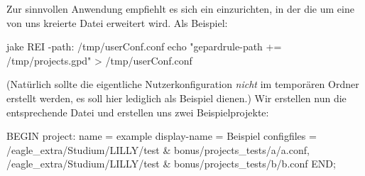 \begin{bemerkung}
    Zur sinnvollen Anwendung empfiehlt es sich ein  einzurichten, in der die \Jake[-]  um eine von uns kreierte  Datei erweitert wird. Als Beispiel:
    \begin{bash}
jake REI -path: /tmp/userConf.conf
echo "gepardrule-path += /tmp/projects.gpd" > /tmp/userConf.conf
    \end{bash}
    (Natürlich sollte die eigentliche Nutzerkonfiguration \emph{nicht} im temporären Ordner erstellt werden, es soll hier lediglich als Beispiel dienen.)\newline
    Wir erstellen nun die entsprechende Datei  und erstellen uns zwei Beispielprojekte:
\begin{gepard}
BEGIN project:
    name          = example
    display-name  = Beispiel
    configfiles   = /eagle_extra/Studium/LILLY/test & bonus/projects_tests/a/a.conf, /eagle_extra/Studium/LILLY/test & bonus/projects_tests/b/b.conf
END;


\end{gepard}
\end{bemerkung}
